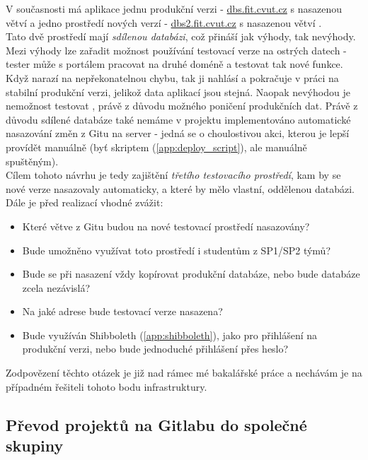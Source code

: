 V současnosti má aplikace jednu produkční verzi - \url{dbs.fit.cvut.cz} s nasazenou větví  a jedno  prostředí nových verzí - \url{dbs2.fit.cvut.cz} s nasazenou větví .\\
Tato dvě prostředí mají \emph{sdílenou databázi}, což přináší jak výhody, tak nevýhody. Mezi výhody lze zařadit možnost používání testovací verze na ostrých datech - tester může s portálem pracovat na druhé doméně a testovat tak nové funkce. Když narazí na nepřekonatelnou chybu, tak ji nahlásí a pokračuje v práci na stabilní produkční verzi, jelikož data aplikací jsou stejná. Naopak nevýhodou je nemožnost testovat , právě z důvodu možného poničení produkčních dat. Právě z důvodu sdílené databáze také nemáme v projektu implementováno automatické nasazování změn z Gitu na server - jedná se o choulostivou akci, kterou je lepší provídět manuálně (byť skriptem (\ref{app:deploy_script}), ale manuálně spuštěným).\\
Cílem tohoto návrhu je tedy zajištění \emph{třetího testovacího prostředí}, kam by se nové verze nasazovaly automaticky, a které by mělo vlastní, oddělenou databázi. Dále je před realizací vhodné zvážit:
\begin{itemize}
	\item Které větve z Gitu budou na nové testovací prostředí nasazovány?
	\item Bude umožněno využívat toto prostředí i studentům z SP1/SP2 týmů?
	\item Bude se při nasazení vždy kopírovat produkční databáze, nebo bude databáze zcela nezávislá?
	\item Na jaké adrese bude testovací verze nasazena?
	\item Bude využíván Shibboleth (\ref{app:shibboleth}), jako pro přihlášení na produkční verzi, nebo bude jednoduché přihlášení přes heslo?
\end{itemize}
Zodpovězení těchto otázek je již nad rámec mé bakalářské práce a nechávám je na případném řešiteli tohoto bodu infrastruktury.

\subsection{Převod projektů na Gitlabu do společné skupiny}

